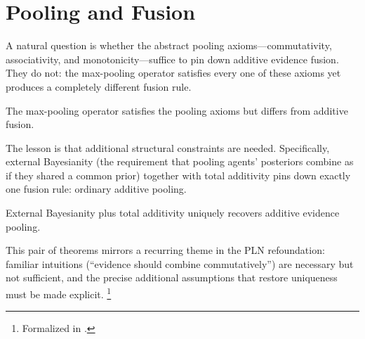 \documentclass[11pt,openany]{report}
\begin{document}
\section{Pooling and Fusion}

A natural question is whether the abstract pooling axioms---commutativity,
associativity, and monotonicity---suffice to pin down additive evidence
fusion.  They do not: the max-pooling operator satisfies every one of
these axioms yet produces a completely different fusion rule.

\begin{theorem}
The max-pooling operator satisfies the pooling axioms but differs from
additive fusion.
\end{theorem}

The lesson is that additional structural constraints are needed.
Specifically, external Bayesianity (the requirement that pooling agents'
posteriors combine as if they shared a common prior) together with total
additivity pins down exactly one fusion rule: ordinary additive pooling.

\begin{theorem}
External Bayesianity plus total additivity uniquely recovers additive
evidence pooling.
\end{theorem}

This pair of theorems mirrors a recurring theme in the PLN refoundation:
familiar intuitions (``evidence should combine commutatively'') are
necessary but not sufficient, and the precise additional assumptions that
restore uniqueness must be made explicit.%
\footnote{Formalized in .}

\end{document}
